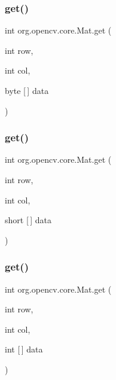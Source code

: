 \subsubsection{\texorpdfstring{get()}{get()}\hspace{0.1cm}{\footnotesize\ttfamily [1/6]}}
{\footnotesize\ttfamily int org.\+opencv.\+core.\+Mat.\+get (\begin{DoxyParamCaption}\item[{int}]{row,  }\item[{int}]{col,  }\item[{byte \mbox{[}$\,$\mbox{]}}]{data }\end{DoxyParamCaption})}

\mbox{\label{classorg_1_1opencv_1_1core_1_1_mat_aa1a035119cc01d317423b60eac0012c7}} 
\subsubsection{\texorpdfstring{get()}{get()}\hspace{0.1cm}{\footnotesize\ttfamily [2/6]}}
{\footnotesize\ttfamily int org.\+opencv.\+core.\+Mat.\+get (\begin{DoxyParamCaption}\item[{int}]{row,  }\item[{int}]{col,  }\item[{short \mbox{[}$\,$\mbox{]}}]{data }\end{DoxyParamCaption})}

\mbox{\label{classorg_1_1opencv_1_1core_1_1_mat_a2da432d61617c9a7f4c4ed6885ba3563}} 
\subsubsection{\texorpdfstring{get()}{get()}\hspace{0.1cm}{\footnotesize\ttfamily [3/6]}}
{\footnotesize\ttfamily int org.\+opencv.\+core.\+Mat.\+get (\begin{DoxyParamCaption}\item[{int}]{row,  }\item[{int}]{col,  }\item[{int \mbox{[}$\,$\mbox{]}}]{data }\end{DoxyParamCaption})}

